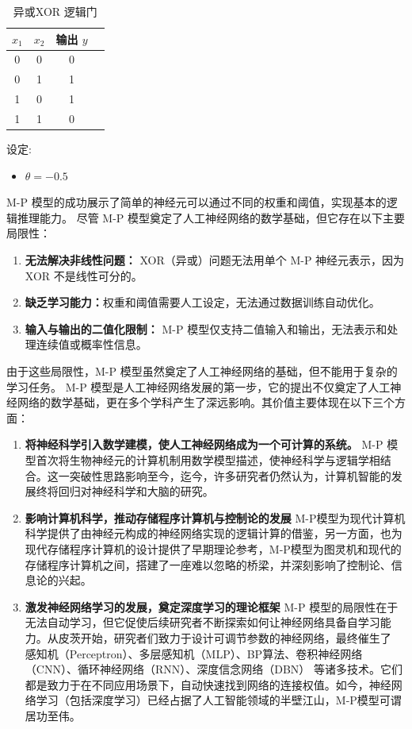 \begin{table}[htbp]
\centering
\caption{异或XOR 逻辑门}
\begin{tabular}{|c|c|c|c|}
\hline
{\bf $x_1$} & $x_2$ & 输出 $y$ \\
\hline
0  & 0  & 0    \\
\hline
0  & 1  & 1   \\
\hline
1  & 0  & 1    \\
\hline
1  & 1  & 0   \\
\hline
\end{tabular}
\label{XOR逻辑门}
\end{table}
设定:
\begin{itemize}
\item $\theta =-0.5$
\end{itemize}
M-P 模型的成功展示了简单的神经元可以通过不同的权重和阈值，实现基本的逻辑推理能力。
尽管 M-P 模型奠定了人工神经网络的数学基础，但它存在以下主要局限性：
\begin{enumerate}
\item {\bf 无法解决非线性问题：} XOR（异或）问题无法用单个 M-P 神经元表示，因为 XOR 不是线性可分的。
\item {\bf 缺乏学习能力：}权重和阈值需要人工设定，无法通过数据训练自动优化。
\item {\bf 输入与输出的二值化限制：} M-P 模型仅支持二值输入和输出，无法表示和处理连续值或概率性信息。
\end{enumerate}
由于这些局限性，M-P 模型虽然奠定了人工神经网络的基础，但不能用于复杂的学习任务。
 M-P 模型是人工神经网络发展的第一步，它的提出不仅奠定了人工神经网络的数学基础，更在多个学科产生了深远影响。其价值主要体现在以下三个方面：
\begin{enumerate}
\item {\bf 将神经科学引入数学建模，使人工神经网络成为一个可计算的系统。 }
M-P 模型首次将生物神经元的计算机制用数学模型描述，使神经科学与逻辑学相结合。这一突破性思路影响至今，迄今，许多研究者仍然认为，计算机智能的发展终将回归对神经科学和大脑的研究。
\item {\bf  影响计算机科学，推动存储程序计算机与控制论的发展 }
M-P模型为现代计算机科学提供了由神经元构成的神经网络实现的逻辑计算的借鉴，另一方面，也为现代存储程序计算机的设计提供了早期理论参考，M-P模型为图灵机和现代的存储程序计算机之间，搭建了一座难以忽略的桥梁，并深刻影响了控制论、信息论的兴起。
\item {\bf  激发神经网络学习的发展，奠定深度学习的理论框架}
M-P 模型的局限性在于无法自动学习，但它促使后续研究者不断探索如何让神经网络具备自学习能力。从皮茨开始，研究者们致力于设计可调节参数的神经网络，最终催生了 感知机（Perceptron）、多层感知机（MLP）、BP算法、卷积神经网络（CNN）、循环神经网络（RNN）、深度信念网络（DBN） 等诸多技术。它们都是致力于在不同应用场景下，自动快速找到网络的连接权值。如今，神经网络学习（包括深度学习）已经占据了人工智能领域的半壁江山，M-P模型可谓居功至伟。
\end{enumerate}
